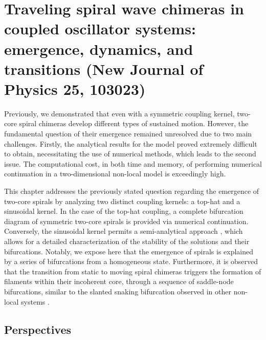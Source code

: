 \chapter{Traveling spiral wave chimeras in coupled
oscillator systems: emergence, dynamics, and
transitions (New Journal of Physics 25, 103023)}

\label{ch:travelingspirals}

Previously, we demonstrated that even with a symmetric coupling kernel, two-core spiral chimeras develop different
types of sustained motion. However, the fundamental question of their emergence remained
unresolved due to two main challenges. Firstly, the analytical results for the model proved
extremely difficult to obtain, necessitating the use of numerical methods, which leads to the second 
issue. The computational cost, in both time
and memory, of performing numerical continuation in a two-dimensional non-local model is exceedingly high.

This chapter addresses the previously stated question regarding the emergence of two-core spirals by analyzing two distinct coupling kernels: a
top-hat and a sinusoidal kernel. In the case of the top-hat coupling, a complete bifurcation diagram of symmetric two-core spirals
is provided via numerical continuation. Conversely, the sinusoidal kernel
permits a semi-analytical approach \cite{omel2018stability,xie2015twisted,omel2019chimerapedia}, which allows for a detailed 
characterization of the stability of the solutions and their bifurcations. Notably,
we expose here that the emergence of spirals is explained by a series of bifurcations from a homogeneous
state. Furthermore, it is observed that the transition from static to moving spiral chimeras
triggers the formation of filaments within their incoherent core, through a sequence of saddle-node
bifurcations, similar to the slanted snaking bifurcation observed in other non-local systems
\cite{firth2007proposed,firth20017homoclinic,barbay2008homoclinic,thiele2013localized}. 



\section{Perspectives}

